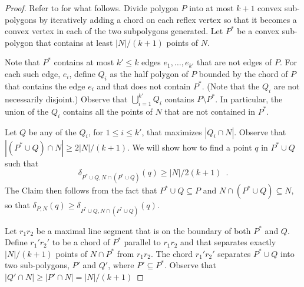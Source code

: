 \documentclass{birkjour}
\begin{document}
\begin{proof}
Refer to  for what follows.  Divide polygon $P$ into
at most $k+1$ convex sub-polygons by iteratively adding a chord on each
reflex vertex so that it becomes a convex vertex in each of the two
subpolygons generated.  Let $P^*$ be a convex sub-polygon that contains
at least $|N|/(k+1)$ points of $N$.

Note that $P^*$ contains at most $k'\le k$ edges $e_1,\ldots,e_{k'}$
that are not edges of $P$.  For each such edge, $e_i$, define $Q_i$
as the half polygon of $P$ bounded by the chord of $P$ that contains
the edge $e_i$ and that does not contain $P^*$.  (Note that the $Q_i$
are not necessarily disjoint.) Observe that $\bigcup_{i=1}^{k'} Q_i$
contains $P\setminus P^*$.  In particular, the union of the $Q_i$
contains all the points of $N$ that are not contained in $P^*$.

Let $Q$ be any of the $Q_i$, for $1\le i\le k'$, that maximizes
$|Q_i\cap N|$.  Observe that $|(P^*\cup Q)\cap N|\ge 2|N|/(k+1)$.
We will show how to find a point $q$ in $P^*\cup Q$ such that 
\[
   \delta_{P^*\cup Q,N\cap(P^*\cup Q)}(q) \ge |N|/2(k+1) \enspace .
\]
The Claim then follows from the fact that $P^*\cup Q\subseteq P$ and
$N\cap(P^*\cup Q)\subseteq N$, so that $\delta_{P,N}(q) \ge
\delta_{P^*\cup Q,N\cap(P^*\cup Q)}(q)$.

Let $r_1r_2$ be a maximal line segment that is on the boundary of both
$P^*$ and $Q$.  Define $r_1'r_2'$ to be a chord of $P^*$ parallel to
$r_1r_2$ and that separates exactly $|N|/(k+1)$ points of $N\cap P^*$
from $r_1r_2$.  The chord $r_1'r_2'$ separates $P^*\cup Q$ into two
sub-polygons, $P'$ and $Q'$, where $P'\subseteq P^*$.  Observe that
$|Q'\cap N|\ge |P'\cap N| = |N|/(k+1)$


\end{proof}
\end{document}
